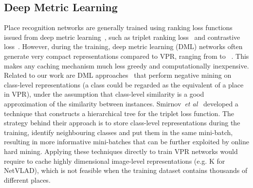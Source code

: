 \documentclass{bmvc2k}
\def\etal{\emph{et al}\bmvaOneDot}
\begin{document}
\subsection{Deep Metric Learning}\label{ssec:dml}
Place recognition networks are generally trained using ranking loss functions issued from deep metric learning~\cite{zhang2021visual}, such as triplet ranking loss~\cite{schroff2015facenet} and contrastive loss~\cite{thoma2020soft}. However, during the training, deep metric learning (DML) networks often generate very compact representations compared to VPR, ranging from  to ~\cite{chen2021deep}. This makes any caching mechanism much less greedy and computationally inexpensive. Related to our work are DML approaches~\cite{ge2018deep, smirnov2018hard} that perform negative mining on class-level representations (a class could be regarded as the equivalent of a place in VPR), under the assumption that class-level similarity is a good approximation of the similarity between instances.  Smirnov~\etal~\cite{ge2018deep} developed a technique that constructs a hierarchical tree for the triplet loss function. The strategy behind their approach is to store class-level representations during the training, identify neighbouring classes and put them in the same mini-batch, resulting in more informative mini-batches that can be further exploited by online hard mining. Applying these techniques directly to train VPR networks would require to cache highly dimensional image-level representations (e.g. K for NetVLAD), which is not feasible when the training dataset contains thousands of different places.
\end{document}
